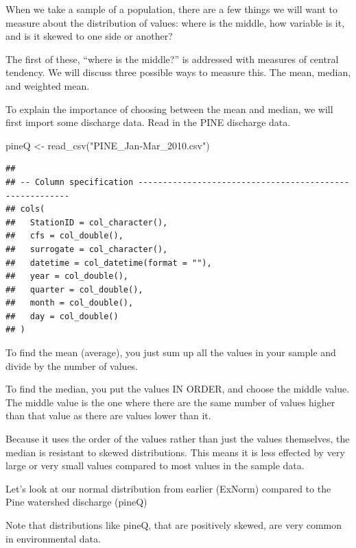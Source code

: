 \documentclass[
]{book}
\newenvironment{Shaded}{\begin{snugshade}}{\end{snugshade}}
\newcommand{\FunctionTok}[1]{\textcolor[rgb]{0.00,0.00,0.00}{#1}}
\newcommand{\NormalTok}[1]{#1}
\newcommand{\OtherTok}[1]{\textcolor[rgb]{0.56,0.35,0.01}{#1}}
\newcommand{\StringTok}[1]{\textcolor[rgb]{0.31,0.60,0.02}{#1}}
\begin{document}
When we take a sample of a population, there are a few things we will want to measure about the distribution of values: where is the middle, how variable is it, and is it skewed to one side or another?

The first of these, ``where is the middle?'' is addressed with measures of central tendency. We will discuss three possible ways to measure this. The mean, median, and weighted mean.

To explain the importance of choosing between the mean and median, we will first import some discharge data. Read in the PINE discharge data.

\begin{Shaded}
\begin{Highlighting}[]
\NormalTok{pineQ }\OtherTok{\textless{}{-}} \FunctionTok{read\_csv}\NormalTok{(}\StringTok{"PINE\_Jan{-}Mar\_2010.csv"}\NormalTok{)}
\end{Highlighting}
\end{Shaded}

\begin{verbatim}
## 
## -- Column specification --------------------------------------------------------
## cols(
##   StationID = col_character(),
##   cfs = col_double(),
##   surrogate = col_character(),
##   datetime = col_datetime(format = ""),
##   year = col_double(),
##   quarter = col_double(),
##   month = col_double(),
##   day = col_double()
## )
\end{verbatim}

To find the mean (average), you just sum up all the values in your sample and divide by the number of values.

To find the median, you put the values IN ORDER, and choose the middle value. The middle value is the one where there are the same number of values higher than that value as there are values lower than it.

Because it uses the order of the values rather than just the values themselves, the median is resistant to skewed distributions. This means it is less effected by very large or very small values compared to most values in the sample data.

Let's look at our normal distribution from earlier (ExNorm) compared to the Pine watershed discharge (pineQ)

Note that distributions like pineQ, that are positively skewed, are very common in environmental data.
\end{document}
